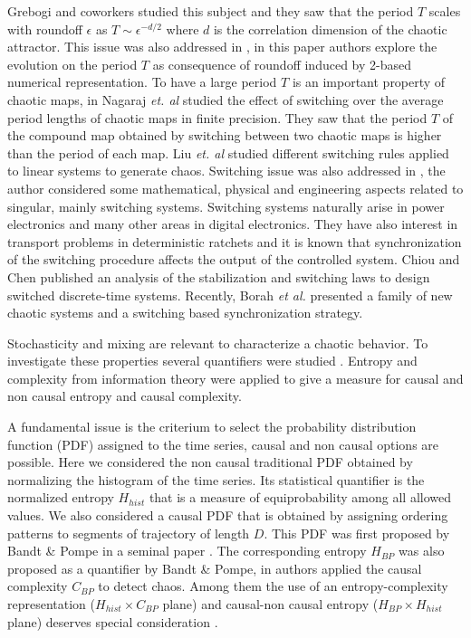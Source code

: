 Grebogi and coworkers \cite{Grebogi1988} studied this subject and they saw that the period $T$ scales with roundoff $\epsilon$ as $T\sim\epsilon^{-d/2}$ where $d$ is the correlation dimension of the chaotic attractor.
This issue was also addressed in \cite{Persohn2012}, in this paper authors explore the evolution on the period $T$ as consequence of roundoff induced by 2-based numerical representation.
To have a large period $T$ is an important property of chaotic maps, in \cite{Nagaraj2008} Nagaraj \textit{et. al} studied the effect of switching over the average period lengths of chaotic maps in finite precision.
They saw that the period $T$ of the compound map obtained by switching between two chaotic maps is higher than the period of each map.
Liu \textit{et. al} \cite{Liu2006} studied different switching rules applied to linear systems to generate chaos.
Switching issue was also addressed in \cite{Gluskin2008}, the author considered some mathematical, physical and engineering aspects related to singular, mainly switching systems.
Switching systems naturally arise in power electronics and many other areas in digital electronics.
They have also interest in transport problems in deterministic ratchets \cite{Zarlenga2009} and it is known that synchronization of the switching procedure affects the output of the controlled system.
Chiou and Chen \cite{Chiou2009} published an analysis of the stabilization and switching laws to design switched discrete-time systems.
Recently, Borah \textit{et al.} \cite{Borah2017} presented a family of new chaotic systems and a switching based synchronization strategy.

Stochasticity and mixing are relevant to characterize a chaotic behavior.
To investigate these properties several quantifiers were studied \cite{DeMicco2009}.
Entropy and complexity from information theory were applied to give a measure for causal and non causal entropy and causal complexity.

A fundamental issue is the criterium to select the probability distribution function (PDF) assigned to the time series, causal and non causal options are possible.
Here we considered the non causal traditional PDF obtained by normalizing the histogram of the time series.
Its statistical quantifier is the normalized entropy $H_{hist}$ that is a measure of equiprobability among all allowed values.
We also considered a causal PDF that is obtained by assigning ordering patterns to segments of trajectory of length $D$.
This PDF was first proposed by Bandt \& Pompe in a seminal paper \cite{Bandt2002}.
The corresponding entropy $H_{BP}$ was also proposed as a quantifier by Bandt \& Pompe, in \cite{Rosso2007} authors applied the causal complexity $C_{BP}$ to detect chaos.
Among them the use of an entropy-complexity representation ($H_{hist} \times C_{BP}$ plane) and causal-non causal entropy ($H_{BP} \times H_{hist}$ plane) deserves special consideration \cite{DeMicco2009,Rosso2007,DeMicco2008,DeMicco2012,Rosso2007a,Rosso2010,Antonelli2017}.

